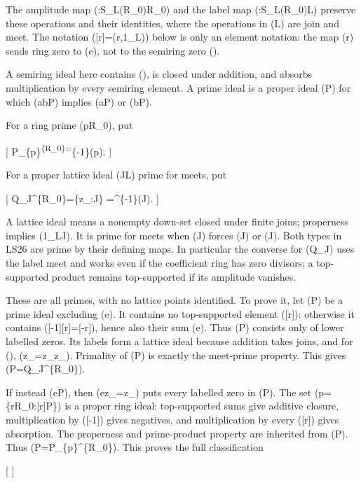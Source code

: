 \documentclass[
]{article}
\begin{document}
The amplitude map (:S\_L(R\_0)\to R\_0) and the label
map (:S\_L(R\_0)\to L) preserve these operations and
their identities, where the operations in (L) are join and meet. The
notation ({[}r{]}=(r,1\_L)) below is only an element notation: the map
(r\mapsto[r]) sends ring zero to (e), not to the semiring zero (\tau).

A semiring ideal here contains (\tau), is closed under addition, and
absorbs multiplication by every semiring element. A prime ideal is a
proper ideal (P) for which (ab\in P) implies (a\in P) or (b\in P).

For a ring prime (\mathfrak p\subset R\_0), put

{[}
P\_\{\mathfrak p\}\textsuperscript{\{R\_0\}=}\{-1\}(\mathfrak p).
{]}

For a proper lattice ideal (J\subset L) prime for meets, put

{[} Q\_J\^{}\{R\_0\}=\{z\_\lambda:\lambda\in J\}
=\^{}\{-1\}(J).  {]}

A lattice ideal means a nonempty down-set closed under finite joins;
properness implies (1\_L\notin J). It is prime for meets when
(\lambda\wedge\mu\in J) forces (\lambda\in J) or (\mu\in J). Both types
in LS26 are prime by their defining maps. In particular the converse for
(Q\_J) uses the label meet and works even if the coefficient ring has
zero divisors; a top-supported product remains top-supported if its
amplitude vanishes.

These are all primes, with no lattice points identified. To prove it,
let (P) be a prime ideal excluding (e). It contains no top-supported
element ({[}r{]}): otherwise it contains ({[}-1{]}{[}r{]}={[}-r{]}),
hence also their sum (e). Thus (P) consists only of lower labelled
zeros. Its labels form a lattice ideal because addition takes joins, and
for (\mu\le\lambda), (z\_\mu=z\_\lambda z\_\mu). Primality of (P) is
exactly the meet-prime property. This gives (P=Q\_J\^{}\{R\_0\}).

If instead (e\in P), then (ez\_\lambda=z\_\lambda) puts every labelled
zero in (P). The set (\mathfrak p=\{r\in R\_0:{[}r{]}\in P\}) is a
proper ring ideal: top-supported sums give additive closure,
multiplication by ({[}-1{]}) gives negatives, and multiplication by
every ({[}r{]}) gives absorption. The properness and prime-product
property are inherited from (P). Thus
(P=P\_\{\mathfrak p\}\^{}\{R\_0\}). This proves the full classification

{[} 
 {]}
\end{document}
